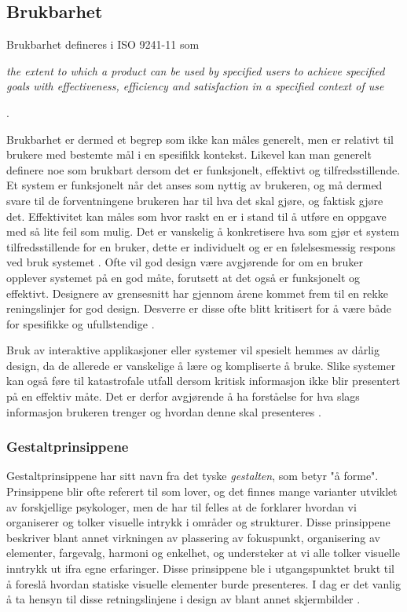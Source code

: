 \subsection{Brukbarhet}
\label{chp: brukbarhet}

Brukbarhet defineres i ISO 9241-11 som

\noindent
\begin{otherlanguage}{english}
\emph{the extent to which a product can be used by specified users to achieve specified goals with effectiveness, efficiency and satisfaction in a specified context of use}
\end{otherlanguage}
 \cite{Svanes08}.

\noindent
Brukbarhet er dermed et begrep som ikke kan måles generelt, men er relativt til brukere med bestemte mål i en spesifikk kontekst. Likevel kan man generelt definere noe som brukbart dersom det er funksjonelt, effektivt og tilfredsstillende. Et system er funksjonelt når det anses som nyttig av brukeren, og må dermed svare til de forventningene brukeren har til hva det skal gjøre, og faktisk gjøre det. Effektivitet kan måles som hvor raskt en er i stand til å utføre en oppgave med så lite feil som mulig. Det er vanskelig å konkretisere hva som gjør et system tilfredsstillende for en bruker, dette er individuelt og er en følelsesmessig respons ved bruk systemet \cite{Kuniavsky}. Ofte vil god design være avgjørende for om en bruker opplever systemet på en god måte, forutsett at det også er funksjonelt og effektivt. Designere av grensesnitt har gjennom årene kommet frem til en rekke reningslinjer for god design. Desverre er disse ofte blitt kritisert for å være både for spesifikke og ufullstendige \cite{mmi}. 

\noindent
Bruk av interaktive applikasjoner eller systemer vil spesielt hemmes av dårlig design, da de allerede er vanskelige å lære og kompliserte å bruke. Slike systemer kan også føre til katastrofale utfall dersom kritisk informasjon ikke blir presentert på en effektiv måte. Det er derfor avgjørende å ha forståelse for hva slags informasjon brukeren trenger og hvordan denne skal presenteres \cite{Ebright10}. 

\subsubsection{Gestaltprinsippene}
Gestaltprinsippene har sitt navn fra det tyske \emph{gestalten}, som betyr "å forme". Prinsippene blir ofte referert til som lover, og det finnes mange varianter utviklet av forskjellige psykologer, men de har til felles at de forklarer hvordan vi organiserer og tolker visuelle intrykk i områder og strukturer. Disse prinsippene beskriver blant annet virkningen av plassering av fokuspunkt, organisering av elementer, fargevalg, harmoni og enkelhet, og understeker at vi alle tolker visuelle inntrykk ut ifra egne erfaringer. 
Disse prinsippene ble i utgangspunktet brukt til å foreslå hvordan statiske visuelle elementer burde presenteres. I dag er det vanlig å ta hensyn til disse retningslinjene i design av blant annet skjermbilder \cite{Chang02}. 

